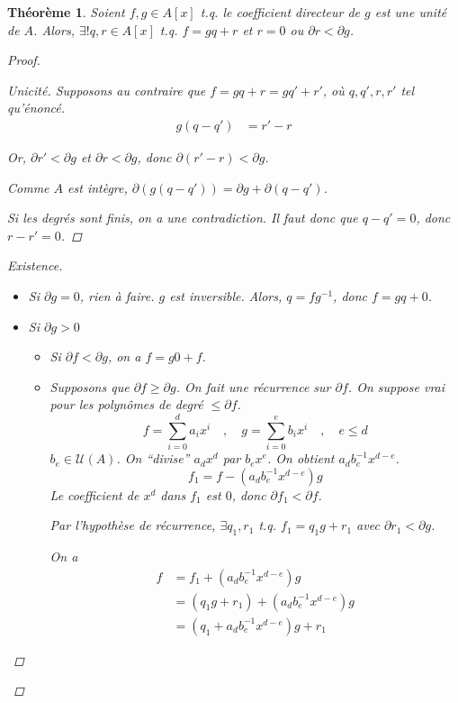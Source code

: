 \documentclass{report}
\newtheorem*{thm}{Th\'eor\`eme}
\theoremstyle{definition}
\theoremstyle{remark}
\newenvironment*{subproof}[1][D\'emonstration]
{
\begin{proof}[#1]

}
{
\renewcommand{\qedsymbol}{$\blacksquare$}
\end{proof}
\renewcommand{\qedsymbol}{$\square$}
}
\def\lte{\leqslant}
\def\gte{\geqslant}
\begin{document}
	\begin{thm}
		Soient $f,g\in A[x]$ t.q. le coefficient directeur de $g$ est une unit\'e de $A$. Alors, $\exists! q,r\in A[x]$ t.q. $f=gq+r$ et $r=0$ ou $\partial r<\partial g$.
		\begin{proof}~

			\begin{subproof}[Unicit\'e]
				Supposons au contraire que $f=gq+r=gq'+r'$, o\`u $q,q',r,r'$ tel qu'\'enonc\'e.
				\begin{align*}
					g(q-q')&= r'-r
				\end{align*}

				Or, $\partial r'<\partial g$ et $\partial r<\partial g$, donc $\partial(r'-r)<\partial g$.

				Comme $A$ est int\`egre, $\partial(g(q-q'))=\partial g+\partial(q-q')$.

				Si les degr\'es sont finis, on a une contradiction. Il faut donc que $q-q'=0$, donc $r-r'=0$.
			\end{subproof}
			\begin{subproof}[Existence]~

				\begin{itemize}
					\item Si $\partial g=0$, rien \`a faire. $g$ est inversible. Alors, $q=fg^{-1}$, donc $f=gq+0$.
					\item Si $\partial g>0$
					\begin{itemize}
						\item Si $\partial f<\partial g$, on a $f=g0+f$.
						\item Supposons que $\partial f \gte \partial g$. On fait une r\'ecurrence sur $\partial f$. On suppose vrai pour les polyn\^omes de degr\'e $\lte\partial f$.
						\[ f=\sum_{i=0}^{d}a_ix^i \quad,\quad g=\sum_{i=0}^{e}b_ix^i \quad,\quad e \lte d \]
						$b_e\in\mathcal{U}(A)$. On ``divise'' $a_dx^d$ par $b_ex^e$. On obtient $a_db_e^{-1}x^{d-e}$.
						\[ f_1=f-\left( a_db_e^{-1}x^{d-e} \right)g \]
						Le coefficient de $x^d$ dans $f_1$ est $0$, donc $\partial f_1<\partial f$.

						Par l'hypoth\`ese de r\'ecurrence, $\exists q_1,r_1$ t.q. $f_1=q_1g+r_1$ avec $\partial r_1<\partial g$.

						On a
						\begin{align*}
							f&= f_1 + \left( a_db_e^{-1}x^{d-e} \right) g\\
							&= (q_1g+r_1) + \left( a_db_e^{-1}x^{d-e} \right) g\\
							&= \left( q_1+a_db_e^{-1}x^{d-e} \right) g+r_1
						\end{align*}
					\end{itemize}
				\end{itemize}
			\end{subproof}
		\end{proof}
	\end{thm}
\end{document}
